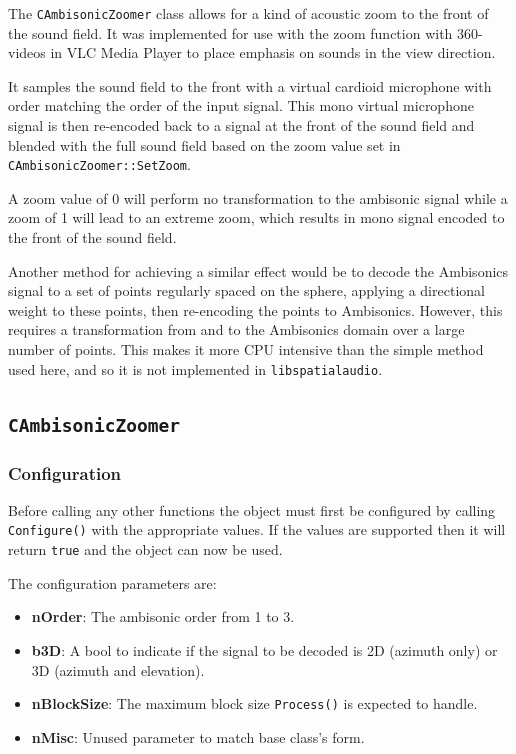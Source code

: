 \documentclass[12pt]{report}
\newcommand{\code}[1]{\texttt{#1}}
\begin{document}
The \code{CAmbisonicZoomer} class allows for a kind of acoustic zoom to the front of the sound field.
It was implemented for use with the zoom function with 360-videos in VLC Media Player to place emphasis on sounds in the view direction.

It samples the sound field to the front with a virtual cardioid microphone with order matching the order of the input signal.
This mono virtual microphone signal is then re-encoded back to a signal at the front of the sound field and blended with the full sound field based on the zoom value set in \code{CAmbisonicZoomer::SetZoom}.

A zoom value of 0 will perform no transformation to the ambisonic signal while a zoom of 1 will lead to an extreme zoom, which results in mono signal encoded to the front of the sound field.

Another method for achieving a similar effect would be to decode the Ambisonics signal to a set of points regularly spaced on the sphere, applying a directional weight to these points, then re-encoding the points to Ambisonics.
However, this requires a transformation from and to the Ambisonics domain over a large number of points. This makes it more CPU intensive than the simple method used here, and so it is not implemented in \code{libspatialaudio}.

\subsection{\code{CAmbisonicZoomer}}

\subsubsection{Configuration}

Before calling any other functions the object must first be configured by calling \code{Configure()} with the appropriate values. If the values are supported then it will return \code{true} and the object can now be used.

The configuration parameters are:
\begin{itemize}
    \item \textbf{nOrder}: The ambisonic order from 1 to 3.
    \item \textbf{b3D}: A bool to indicate if the signal to be decoded is 2D (azimuth only) or 3D (azimuth and elevation).
    \item \textbf{nBlockSize}: The maximum block size \code{Process()} is expected to handle.
    \item \textbf{nMisc}: Unused parameter to match base class's form.
\end{itemize}
\end{document}
